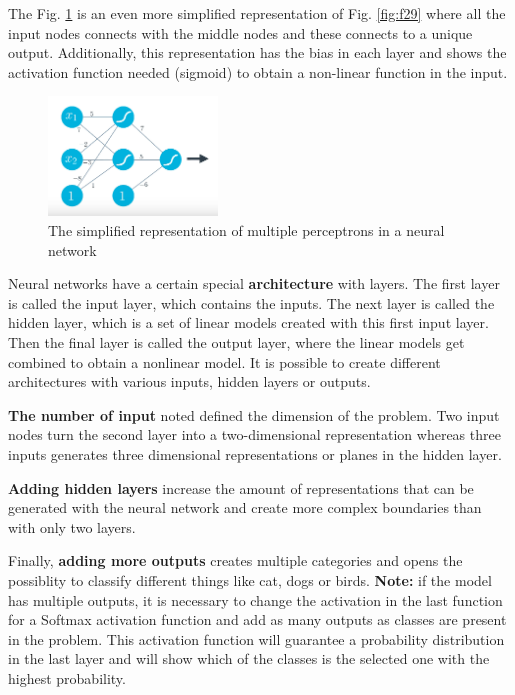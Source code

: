 \documentclass{article}
\begin{document}
The Fig. \ref{fig:f30} is an even more simplified representation of Fig. \ref{fig:f29} where all the input nodes connects with the middle nodes and these connects to a unique output. Additionally, this representation has the bias in each layer and shows the activation function needed (sigmoid) to obtain a non-linear function in the input.

\begin{figure}[ht]
    \centering
    \includegraphics[width=0.4\textwidth,height=0.4\textheight,keepaspectratio]{images/adding_perceptrons_3.png}
    \captionsetup{justification=centering}
    \caption{The simplified representation of multiple perceptrons in a neural network}
    \label{fig:f30}
\end{figure}

Neural networks have a certain special \textbf{architecture} with layers. The first layer is called the input layer, which contains the inputs. The next layer is called the hidden layer, which is a set of linear models created with this first input layer. Then the final layer is called the output layer, where the linear models get combined to obtain a nonlinear model. It is possible to create different architectures with various inputs, hidden layers or outputs. 

\textbf{The number of input} noted defined the dimension of the problem. Two input nodes turn the second layer into a two-dimensional representation whereas three inputs generates three dimensional representations or planes in the hidden layer. 

\textbf{Adding hidden layers} increase the amount of representations that can be generated with the neural network and create more complex boundaries than with only two layers. 

Finally, \textbf{adding more outputs} creates multiple categories and opens the possiblity to classify different things like cat, dogs or birds. \textbf{Note:} if the model has multiple outputs, it is necessary to change the activation in the last function for a Softmax activation function and add as many outputs as classes are present in the problem. This activation function will guarantee a probability distribution in the last layer and will show which of the classes is the selected one with the highest probability.

\printbibliography
\end{document}
